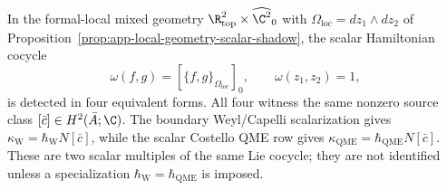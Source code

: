 \begin{thm}
\label{thm:app-scalar-anomaly-transgression}
  In the formal-local mixed geometry
  \(\R^2_{\mathrm{top}}\times\widehat{\C^2}_0\) with
  \(\Omega_{\mathrm{loc}}=dz_1\wedge dz_2\) of
  Proposition~\ref{prop:app-local-geometry-scalar-shadow}, the
  scalar Hamiltonian cocycle
  \[
    \omega(f,g)=[\{f,g\}_{\Omega_{\mathrm{loc}}}]_0,
    \qquad \omega(z_1,z_2)=1,
  \]
  is detected in four equivalent forms.  All four witness the same
  nonzero source class \([\bar c]\in H^2(\bar A;\C)\).  The boundary
  Weyl/Capelli scalarization gives
  \(\kappa_{\mathrm{W}}=\hbar_{\mathrm{W}}N[\bar c]\), while the scalar
  Costello QME row gives
  \(\kappa_{\mathrm{QME}}=\hbar_{\mathrm{QME}}N[\bar c]\).  These are
  two scalar multiples of the same Lie cocycle; they are not identified
  unless a specialization \(\hbar_{\mathrm{W}}=\hbar_{\mathrm{QME}}\) is
  imposed.


\end{thm}
